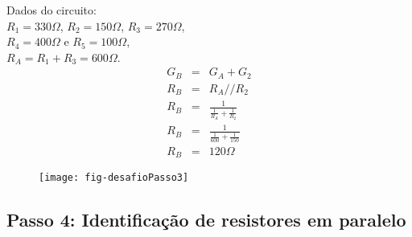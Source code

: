 \begin{minipage}{\linewidth}
  \centering
  \begin{minipage}{0.45\linewidth}
    Dados do circuito: \\
                $R_1 = 330\Omega$,
                $R_2 = 150\Omega$,
                $R_3 = 270\Omega$, \\
                $R_4 = 400\Omega$ e
                $R_5 = 100\Omega$,\\
                $R_A = R_1 + R_3 = 600\Omega$.
       \begin{eqnarray}
         G_B & = & G_A + G_2 \nonumber\\
         R_B & = & R_A // R_2 \nonumber\\
         R_B & = & \frac{1}{\frac{1}{R_A} + \frac{1}{R_2} } \nonumber\\
         R_B & = & \frac{1}{\frac{1}{600} + \frac{1}{150} } \nonumber\\
         R_B & = & 120\Omega \nonumber
       \end{eqnarray}

  \end{minipage}
  \hspace{0.05\linewidth}
  \begin{minipage}{0.45\linewidth}
    \begin{figure}[H]
      \centering
      \texttt{[image: fig-desafioPasso3]}
    \end{figure}
  \end{minipage}
\end{minipage}








\subsection{Passo 4: Identificação de resistores em paralelo}

